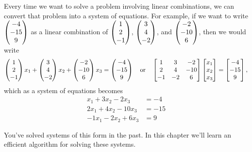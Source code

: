 Every time we want to solve a problem involving linear combinations, we can convert that problem into a system of equations.
For example, if we want to write $\begin{pmatrix} -4\\-15\\9 \end{pmatrix}$ as a linear combination of $\begin{pmatrix} 1\\2\\-1 \end{pmatrix}$, $\begin{pmatrix} 3\\4\\-2 \end{pmatrix}$, and $\begin{pmatrix} -2\\-10\\6 \end{pmatrix}$, then we would write 
$$ 
\begin{pmatrix} 1\\2\\-1 \end{pmatrix}x_1+\begin{pmatrix} 3\\4\\-2 \end{pmatrix}x_2+\begin{pmatrix} -2\\-10\\6 \end{pmatrix}x_3=\begin{pmatrix} -4\\-15\\9 \end{pmatrix}
\quad \text{or}\quad
\begin{bmatrix} \begin{matrix} 1\\2\\-1 \end{matrix}&\begin{matrix} 3\\4\\-2 \end{matrix}&\begin{matrix} -2\\-10\\6 \end{matrix} \end{bmatrix}\begin{bmatrix} x_1\\x_2\\x_3 \end{bmatrix}=\begin{bmatrix} -4\\-15\\9 \end{bmatrix},
$$
which as a system of equations becomes
\begin{align*}
x_1+3x_2-2x_3&=-4 \\
2x_1+4x_2-10x_3&=-15 \\
-1x_1-2x_2+6x_3&=9 
\end{align*}

You've solved systems of this form in the past. In this chapter we'll learn an efficient algorithm for solving these systems.

